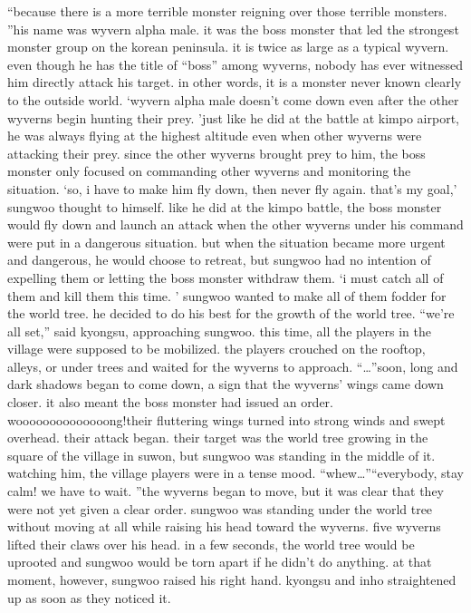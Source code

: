 “because there is a more terrible monster reigning over those terrible monsters.
”his name was wyvern alpha male.
it was the boss monster that led the strongest monster group on the korean peninsula.
it is twice as large as a typical wyvern.
 even though he has the title of “boss” among wyverns, nobody has ever witnessed him directly attack his target.
 in other words, it is a monster never known clearly to the outside world.
‘wyvern alpha male doesn’t come down even after the other wyverns begin hunting their prey.
’just like he did at the battle at kimpo airport, he was always flying at the highest altitude even when other wyverns were attacking their prey.
 since the other wyverns brought prey to him, the boss monster only focused on commanding other wyverns and monitoring the situation.
‘so, i have to make him fly down, then never fly again.
 that’s my goal,’ sungwoo thought to himself.
like he did at the kimpo battle, the boss monster would fly down and launch an attack when the other wyverns under his command were put in a dangerous situation.
 but when the situation became more urgent and dangerous, he would choose to retreat, but sungwoo had no intention of expelling them or letting the boss monster withdraw them.
‘i must catch all of them and kill them this time.
’
sungwoo wanted to make all of them fodder for the world tree.
 he decided to do his best for the growth of the world tree.
“we’re all set,” said kyongsu, approaching sungwoo.
this time, all the players in the village were supposed to be mobilized.
 the players crouched on the rooftop, alleys, or under trees and waited for the wyverns to approach.
“…”soon, long and dark shadows began to come down, a sign that the wyverns’ wings came down closer.
 it also meant the boss monster had issued an order.
woooooooooooooong!their fluttering wings turned into strong winds and swept overhead.
 their attack began.
their target was the world tree growing in the square of the village in suwon, but sungwoo was standing in the middle of it.
watching him, the village players were in a tense mood.
“whew…”“everybody, stay calm! we have to wait.
”the wyverns began to move, but it was clear that they were not yet given a clear order.
sungwoo was standing under the world tree without moving at all while raising his head toward the wyverns.
five wyverns lifted their claws over his head.
 in a few seconds, the world tree would be uprooted and sungwoo would be torn apart if he didn’t do anything.
at that moment, however, sungwoo raised his right hand.
 kyongsu and inho straightened up as soon as they noticed it.

